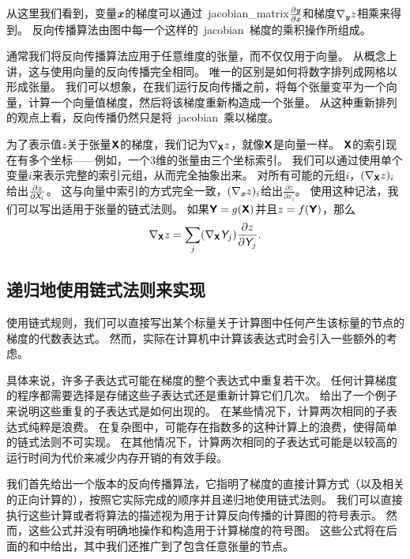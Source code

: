 从这里我们看到，变量$\boldsymbol{\mathit{x}}$的梯度可以通过~\gls{jacobian_matrix}$\frac{\partial \boldsymbol{\mathit{y}}}{\partial \boldsymbol{\mathit{x}}}$和梯度$\nabla_{\boldsymbol{\mathit{y}}} z$相乘来得到。
反向传播算法由图中每一个这样的~\gls{jacobian}~梯度的乘积操作所组成。


通常我们将反向传播算法应用于任意维度的张量，而不仅仅用于向量。
从概念上讲，这与使用向量的反向传播完全相同。 
唯一的区别是如何将数字排列成网格以形成张量。 
我们可以想象，在我们运行反向传播之前，将每个张量变平为一个向量，计算一个向量值梯度，然后将该梯度重新构造成一个张量。
从这种重新排列的观点上看，反向传播仍然只是将~\gls{jacobian}~乘以梯度。


为了表示值$z$关于张量$\textsf{\textbf{X}}$的梯度，我们记为$\nabla_{\textsf{\textbf{X}}} z$，就像$\textsf{\textbf{X}}$是向量一样。
$\textsf{\textbf{X}}$的索引现在有多个坐标——例如，一个3维的张量由三个坐标索引。
我们可以通过使用单个变量$i$来表示完整的索引元组，从而完全抽象出来。
对所有可能的元组$i$，$(\nabla_{\textsf{\textbf{X}}} z)_i$给出$\frac{\partial z}{\partial \textit{\textsf{X}}_i}$。
这与向量中索引的方式完全一致，$(\nabla_{\boldsymbol{\mathit{x}}} z)_i$给出$\frac{\partial z}{\partial x_i}$。
使用这种记法，我们可以写出适用于张量的链式法则。
如果$\textsf{\textbf{Y}}=g(\textsf{\textbf{X}})$并且$z=f(\textsf{\textbf{Y}})$，那么
\begin{equation}
  \nabla_{\textsf{\textbf{X}}} z = \sum_j (\nabla_{\textsf{\textbf{X}}} \textit{\textsf{Y}}_j)\frac{\partial z}{\partial \textit{\textsf{Y}}_j}.
  \label{eq:6.47}
\end{equation}

\subsection{递归地使用链式法则来实现}
\label{sec:recursively_applying_the_chain_rule_to_obtain_backprop}

使用链式规则，我们可以直接写出某个标量关于计算图中任何产生该标量的节点的梯度的代数表达式。
然而，实际在计算机中计算该表达式时会引入一些额外的考虑。

具体来说，许多子表达式可能在梯度的整个表达式中重复若干次。
任何计算梯度的程序都需要选择是存储这些子表达式还是重新计算它们几次。
给出了一个例子来说明这些重复的子表达式是如何出现的。
在某些情况下，计算两次相同的子表达式纯粹是浪费。
在复杂图中，可能存在指数多的这种计算上的浪费，使得简单的链式法则不可实现。
在其他情况下，计算两次相同的子表达式可能是以较高的运行时间为代价来减少内存开销的有效手段。

我们首先给出一个版本的反向传播算法，它指明了梯度的直接计算方式（以及相关的正向计算的），按照它实际完成的顺序并且递归地使用链式法则。
我们可以直接执行这些计算或者将算法的描述视为用于计算反向传播的计算图的符号表示。
然而，这些公式并没有明确地操作和构造用于计算梯度的符号图。
这些公式将在后面的和中给出，其中我们还推广到了包含任意张量的节点。

